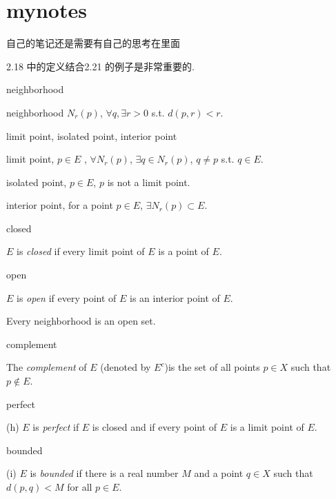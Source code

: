 \section*{mynotes}
自己的笔记还是需要有自己的思考在里面

2.18 中的定义结合2.21 的例子是非常重要的. 

\begin{myDef}neighborhood

    neighborhood $N_r(p)$, $\forall q, \exists r>0$ s.t. $d(p,r)<r$.
\end{myDef}

\begin{myDef}limit point, isolated point, interior point

    limit point, $p\in E$ , $\forall N_r(p)$, $\exists q\in N_r(p)$, $q\neq p$ s.t. $q\in E$.

    isolated point, $p\in E$, $p$ is not a limit point.

    interior point, for a point $p \in E$, $\exists N_r(p)\subset E$.
\end{myDef}

\begin{myDef} closed

    $E$ is \emph{closed} if every limit point of $E$ is a point of $E$.
\end{myDef}

\begin{myDef} open

    $E$ is \emph{open} if every point of $E$ is an interior point of $E$.
\end{myDef}

\begin{mynewthm}
    Every neighborhood is an open set.
\end{mynewthm}

\begin{myDef} complement
    
    The \emph{complement} of $E$ (denoted by $E^c$)is the set of all points $p \in X$ such that $p \not\in E$.
\end{myDef}

\begin{myDef} perfect
    
    (h) $E$ is \emph{perfect} if $E$ is closed and if every point of $E$ is a limit point of $E$.
\end{myDef}
    
\begin{myDef} bounded
    
    (i) $E$ is \emph{bounded} if there is a real number $M$ and a point $q \in X$ such that $d(p,q)< M$ for all $p \in E$.
\end{myDef}    

